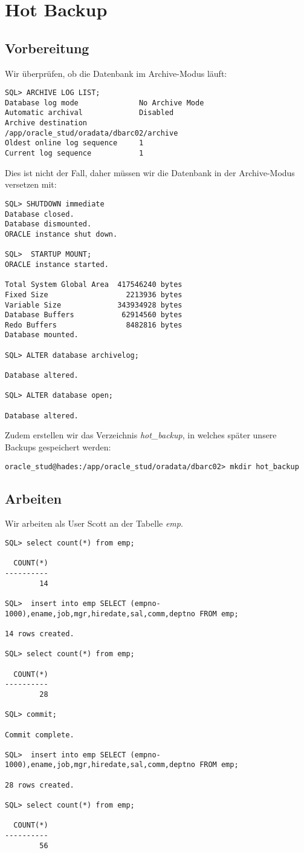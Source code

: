 \documentclass[11pt,a4paper,parskip=half]{scrartcl}
\begin{document}
\newpage
\section{Hot Backup}
\subsection{Vorbereitung}
Wir überprüfen, ob die Datenbank im Archive-Modus läuft:
\begin{lstlisting}
SQL> ARCHIVE LOG LIST;
Database log mode              No Archive Mode
Automatic archival             Disabled
Archive destination            /app/oracle_stud/oradata/dbarc02/archive
Oldest online log sequence     1
Current log sequence           1
\end{lstlisting}

Dies ist nicht der Fall, daher müssen wir die Datenbank in der Archive-Modus versetzen mit:
\begin{lstlisting}
SQL> SHUTDOWN immediate
Database closed.
Database dismounted.
ORACLE instance shut down.

SQL>  STARTUP MOUNT;
ORACLE instance started.

Total System Global Area  417546240 bytes
Fixed Size                  2213936 bytes
Variable Size             343934928 bytes
Database Buffers           62914560 bytes
Redo Buffers                8482816 bytes
Database mounted.

SQL> ALTER database archivelog;

Database altered.

SQL> ALTER database open;

Database altered.
\end{lstlisting}

Zudem erstellen wir das Verzeichnis \emph{hot\_backup}, in welches später unsere Backups gespeichert werden:
\begin{lstlisting}
oracle_stud@hades:/app/oracle_stud/oradata/dbarc02> mkdir hot_backup
\end{lstlisting}
\subsection{Arbeiten}
Wir arbeiten als User Scott an der Tabelle \emph{emp}.

\begin{lstlisting}
SQL> select count(*) from emp;

  COUNT(*)
----------
        14

SQL>  insert into emp SELECT (empno-1000),ename,job,mgr,hiredate,sal,comm,deptno FROM emp;

14 rows created.

SQL> select count(*) from emp;

  COUNT(*)
----------
        28

SQL> commit;

Commit complete.

SQL>  insert into emp SELECT (empno-1000),ename,job,mgr,hiredate,sal,comm,deptno FROM emp;

28 rows created.

SQL> select count(*) from emp;

  COUNT(*)
----------
        56
\end{lstlisting}
\end{document}
